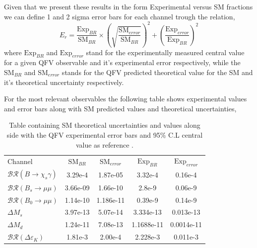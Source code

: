 Given that we present these results in the form Experimental versus SM fractions we can define 1 and 2 sigma error bars for each channel trough the relation, 
%
%
\begin{equation}
E_r = \frac{\text{Exp}_{BR}}{\text{SM}_{BR}} \times \left( \sqrt{\frac{\text{SM}_{error}}{\text{SM}_{BR}}}\right)^2 + \left( \frac{\text{Exp}_{error}}{\text{Exp}_{BR}} \right)^2
\end{equation} 
%
where $\text{Exp}_{BR}$ and $\text{Exp}_{error}$ stand for the experimentally measured central value for a given QFV observable and it's experimental error respectively, while the $\text{SM}_{BR}$ and $\text{SM}_{error}$ stands for the QFV predicted theoretical value for the SM and it's theoretical uncertainty respectively. 

For the most relevant observables the following table shows experimental values and error bars along with SM predicted values and theoretical uncertainties, 
%
\begin{table}[H]
\centering
\begin{tabular}{l|cccc}
 Channel & $\text{SM}_{BR}$         & $\text{SM}_{error}$ & $\text{Exp}_{BR}$ & $\text{Exp}_{error}$   \\ \cline{1-5} 
$\mathcal{BR} ( B \rightarrow \chi_s \gamma )$ & 3.29e-4 & 1.87e-05 & 3.32e-4 & 0.16e-4 \\
$\mathcal{BR} ( B_s \rightarrow \mu \mu ) $ & 3.66e-09 & 1.66e-10 & 2.8e-9 & 0.06e-9       \\
$\mathcal{BR} (B_0 \rightarrow  \mu \mu )$ & 1.14e-10 & 1.186e-11 & 0.39e-9    & 0.14e-9       \\
$\Delta M_s$ & 3.97e-13 & 5.07e-14 & 3.334e-13  &  0.013e-13  \\
$\Delta M_d $ & 1.24e-11 & 7.08e-13 & 1.1688e-11 &  0.0014e-11  \\
$\mathcal{BR} (\Delta \varepsilon_K )$ & 1.81e-3  & 2.00e-4 & 2.228e-3  & 0.011e-3     
\end{tabular}
\caption{Table containing SM theoretical uncertainties and values along side with the QFV experimental error bars and 95\% C.L central value as reference \cite{PhysRevD.98.030001}. }
\end{table}

